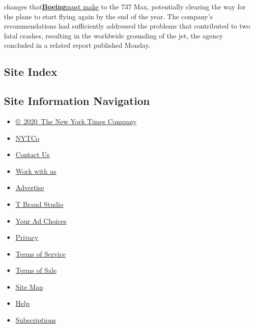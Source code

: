 \begin{itemize}
{  changes
  that}\textbf{\href{https://www.nytimes3xbfgragh.onion/live/2020/08/03/business/stock-market-today-coronavirus/faa-says-boeing-has-effectively-mitigated-defects-in-the-737-max}{Boeing}}\href{https://www.nytimes3xbfgragh.onion/live/2020/08/03/business/stock-market-today-coronavirus/faa-says-boeing-has-effectively-mitigated-defects-in-the-737-max}{must
  make} to the 737 Max, potentially clearing the way for the plane to
  start flying again by the end of the year. The company's
  recommendations had sufficiently addressed the problems that
  contributed to two fatal crashes, resulting in the worldwide grounding
  of the jet, the agency concluded in a related report published Monday.
\end{itemize}

\hypertarget{site-index}{%
\subsection{Site Index}\label{site-index}}

\hypertarget{site-information-navigation}{%
\subsection{Site Information
Navigation}\label{site-information-navigation}}

\begin{itemize}
\tightlist
\item
  \href{https://help.nytimes3xbfgragh.onion/hc/en-us/articles/115014792127-Copyright-notice}{©~2020~The
  New York Times Company}
\end{itemize}

\begin{itemize}
\tightlist
\item
  \href{https://www.nytco.com/}{NYTCo}
\item
  \href{https://help.nytimes3xbfgragh.onion/hc/en-us/articles/115015385887-Contact-Us}{Contact
  Us}
\item
  \href{https://www.nytco.com/careers/}{Work with us}
\item
  \href{https://nytmediakit.com/}{Advertise}
\item
  \href{http://www.tbrandstudio.com/}{T Brand Studio}
\item
  \href{https://www.nytimes3xbfgragh.onion/privacy/cookie-policy\#how-do-i-manage-trackers}{Your
  Ad Choices}
\item
  \href{https://www.nytimes3xbfgragh.onion/privacy}{Privacy}
\item
  \href{https://help.nytimes3xbfgragh.onion/hc/en-us/articles/115014893428-Terms-of-service}{Terms
  of Service}
\item
  \href{https://help.nytimes3xbfgragh.onion/hc/en-us/articles/115014893968-Terms-of-sale}{Terms
  of Sale}
\item
  \href{https://spiderbites.nytimes3xbfgragh.onion}{Site Map}
\item
  \href{https://help.nytimes3xbfgragh.onion/hc/en-us}{Help}
\item
  \href{https://www.nytimes3xbfgragh.onion/subscription?campaignId=37WXW}{Subscriptions}
\end{itemize}
